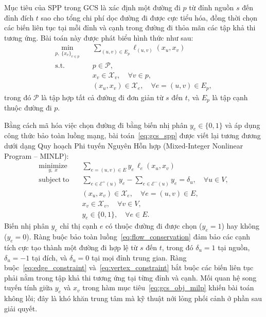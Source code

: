 Mục tiêu của SPP trong GCS là xác định một đường đi $p$ từ đỉnh nguồn $s$ đến
đỉnh đích $t$ sao cho tổng chi phí dọc đường đi được cực tiểu hóa, đồng thời
chọn các biến liên tục tại mỗi đỉnh và cạnh trong đường đi thỏa mãn các tập khả
thi tương ứng. Bài toán này được phát biểu hình thức như sau:
\begin{equation}
  \begin{aligned}
    \min_{p,\; \{x_v\}_{v \in p}} \quad
     & \sum_{(u,v) \in E_p} \ell_{(u,v)}(x_u, x_v)                  \\
    \mathrm{s.t.} \quad
     & p \in \mathcal{P},                                           \\
     & x_v \in \mathcal{X}_v, \quad \forall v \in p,                \\
     & (x_u, x_v) \in \mathcal{X}_e, \quad \forall e=(u,v) \in E_p,
  \end{aligned}
  \label{eq:gcs_spp}
\end{equation}
trong đó $\mathcal{P}$ là tập hợp tất cả đường đi đơn giản từ $s$ đến $t$, và $E_p$
là tập cạnh thuộc đường đi $p$.

Bằng cách mã hóa việc chọn đường đi bằng biến nhị phân $y_e \in \{0, 1\}$ và áp
dụng công thức bảo toàn luồng mạng, bài toán~\eqref{eq:gcs_spp} được viết lại
tương đương dưới dạng Quy hoạch Phi tuyến Nguyên Hỗn hợp (Mixed-Integer
Nonlinear Program -- MINLP):
\begin{subequations}
  \label{eq:gcs_minlp}
  \begin{align}
    \underset{y,\; x}{\mathrm{minimize}} \quad
     & \sum_{e=(u,v) \in E} y_e\, \ell_e(x_u, x_v)
    \label{eq:gcs_obj_milp}                                                  \\
    \mathrm{subject\ to} \quad
     & \sum_{e \in \mathcal{E}^+(u)} y_e - \sum_{e \in \mathcal{E}^-(u)} y_e
    = \delta_u,
    \quad \forall u \in V,
    \label{eq:flow_conservation}                                             \\
     & (x_u, x_v) \in \mathcal{X}_e,
    \quad \forall e=(u,v) \in E,
    \label{eq:edge_constraint}                                               \\
     & x_v \in \mathcal{X}_v,
    \quad \forall v \in V,
    \label{eq:vertex_constraint}                                             \\
     & y_e \in \{0, 1\},
    \quad \forall e \in E.
    \label{eq:binary_variable}
  \end{align}
\end{subequations}
Biến nhị phân $y_e$ chỉ thị cạnh $e$ có thuộc đường đi được chọn ($y_e = 1$) hay
không ($y_e = 0$).
Ràng buộc bảo toàn luồng~\eqref{eq:flow_conservation} đảm bảo các cạnh tích cực tạo
thành một đường đi hợp lệ từ $s$ đến $t$, trong đó $\delta_u = 1$ tại nguồn,
$\delta_u = -1$ tại đích, và $\delta_u = 0$ tại mọi đỉnh trung gian.
Ràng buộc~\eqref{eq:edge_constraint} và~\eqref{eq:vertex_constraint} bắt buộc các
biến liên tục phải nằm trong tập khả thi tương ứng tại từng đỉnh và cạnh.
Mối quan hệ song tuyến tính giữa $y_e$ và $x_v$ trong hàm mục tiêu~\eqref{eq:gcs_obj_milp}
khiến bài toán không lồi; đây là khó khăn trung tâm mà kỹ thuật nới lỏng phối cảnh
ở phần sau giải quyết.

